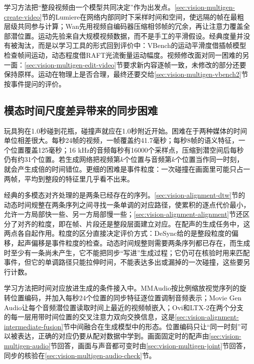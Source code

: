 学习方法把“整段视频由一个模型共同决定”作为出发点。\ref{sec:vision-multigen-create-video}节的Lumiere在网络内部同时下采样时间和空间，使远隔的帧在最粗层级共同参与计算；Wan先用视频自编码器压缩相邻帧的冗余，再让注意力覆盖全部潜位置。运动先验来自大规模视频数据，而不是手工的平滑假设。经典度量并没有被淘汰，而是以学习工具的形式回到评价中：VBench的运动平滑度借插帧模型检查帧间运动，动态程度借RAFT光流衡量运动幅度。视频修改面对同一困难的另一面：\ref{sec:vision-multigen-edit-video}节要求新内容逐帧一致，未修改的部分还要保持原样。运动在物理上是否合理，最终还要交给\ref{sec:vision-multigen-vbench2}节按事件提问的评价。

\subsection{模态时间尺度差异带来的同步困难}
\label{sec:vision-multigen-challenge-sync}

玩具狗在1.0秒碰到花瓶，碰撞声就应在1.0秒附近开始。困难在于两种媒体的时间单位相差很大。每秒24帧的视频，一帧覆盖约41.7毫秒；每秒8帧的语义特征，一个位置覆盖125毫秒；16 kHz的音频每秒有16000个采样点，压缩到潜空间后每秒仍有约31个位置。若生成网络把视频第$k$个位置与音频第$k$个位置当作同一时刻，就会产生成倍的时间错位。更细的困难是事件粒度：一次碰撞在画面里可能只占一两帧，平均到整段的特征里几乎看不出来。

经典的多模态对齐处理的是两条已经存在的序列。\ref{sec:vision-alignment-dtw}节的动态时间规整在两条序列之间寻找一条单调的对应路径，使累积的逐点代价最小，允许一方局部快一些、另一方局部慢一些；\ref{sec:vision-alignment-alignment}节还区分了对齐的粒度，即在帧、片段还是整段层面建立对应。在配声的生成任务中，这两点各自起作用。粒度的区分直接决定评价方式：DeSync给的是整段粒度的偏移，起声偏移是事件粒度的检查。动态时间规整则需要两条序列都已存在，而生成时至少有一条尚未产生，它不能把同步“写进”生成过程；它仍可在核验时用来匹配事件，但它的单调路径只能拉伸时间，不能表达多出或漏掉的一次碰撞，这些要另行计数。

学习方法把时间对应放进生成的条件接入中。MMAudio按比例缩放视觉序列的旋转位置编码，并加入每秒24个位置的同步特征逐位置调制音频表示；Movie Gen Audio让每个音频潜位置读取时间上最近的视频帧嵌入；Ovi和LTX-2在两个分支的每一层用带时间位置的交叉注意力双向交换信息，这是\ref{sec:vision-alignment-intermediate-fusion}节中间融合在生成模型中的形态。位置编码只让“同一时刻”可以被表达，正确的对应仍要从配对数据中学到。画面固定时的配声由\ref{sec:vision-multigen-audio}节回答，画面与声音都可变时由\ref{sec:vision-multigen-joint}节回答，同步的核验在\ref{sec:vision-multigen-audio-check}节。

